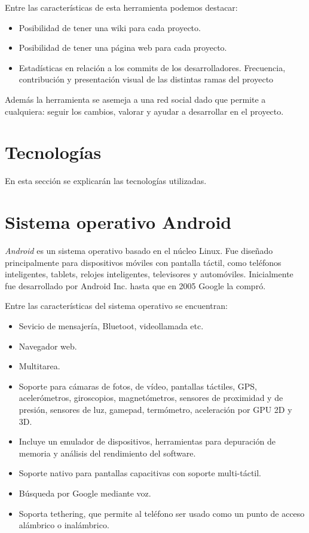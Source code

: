 Entre las características de esta herramienta podemos destacar:
\begin{itemize}
\item Posibilidad de tener una wiki para cada proyecto.
\item Posibilidad de tener una página web para cada proyecto.
\item Estadísticas en relación a los commits de los desarrolladores. Frecuencia, contribución y 
presentación visual de las distintas ramas del proyecto
\end{itemize}
Además la herramienta se asemeja a una red social dado que permite a cualquiera: seguir los cambios, valorar y 
ayudar a desarrollar en el proyecto.

\section{Tecnologías}
En esta sección se explicarán las tecnologías utilizadas.

\section{Sistema operativo Android}

\textit{Android} \cite{URL::Android} es un sistema operativo basado en el núcleo Linux. Fue diseñado principalmente para dispositivos 
móviles con pantalla táctil, como teléfonos inteligentes, tablets, relojes inteligentes, 
televisores y automóviles. Inicialmente fue desarrollado por Android Inc. hasta que en 2005 Google 
la compró.

Entre las características del sistema operativo se encuentran:

\begin{itemize}
\item Sevicio de mensajería, Bluetoot, videollamada etc.
\item Navegador web.
\item Multitarea.
\item Soporte para cámaras de fotos, de vídeo, pantallas táctiles, GPS, acelerómetros, 
giroscopios, magnetómetros, sensores de proximidad y de presión, sensores de luz, gamepad, 
termómetro, aceleración por GPU 2D y 3D.
\item Incluye un emulador de dispositivos, herramientas para depuración de memoria y análisis del rendimiento del software.
\item Soporte nativo para pantallas capacitivas con soporte multi-táctil.
\item Búsqueda por Google mediante voz.
\item Soporta tethering, que permite al teléfono ser usado como un punto de acceso alámbrico o inalámbrico.
\end{itemize}

